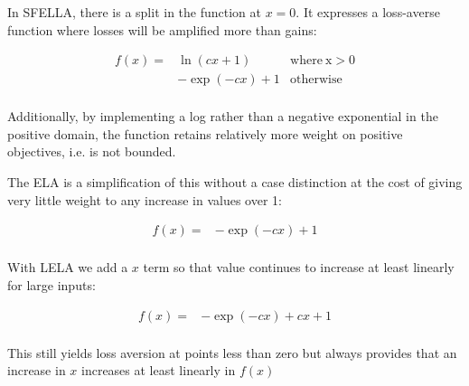 



In SFELLA, there is a split in the function at $x=0$. It expresses a loss-averse function where losses will be amplified more than gains:

\begin{align}
f(x)= & \ln(cx+1) & \mathrm{ where \: x>0} \\ \nonumber
  &  -\exp(-cx)+1 &  \mathrm{otherwise} \\ \nonumber
\end{align}

Additionally, by implementing a log rather than a negative exponential in the positive domain, the function retains relatively more weight on positive objectives, i.e. is not bounded.

The ELA is a simplification of this without a case distinction at the cost of giving very little weight to any increase in values over 1:

\begin{align}
f(x)= &  -\exp(-cx)+1 \\ \nonumber
\end{align}

With LELA we add a $x$ term so that value continues to increase at least linearly for large inputs:

\begin{align}
f(x)= &  -\exp(-cx)+cx+1 \\ \nonumber
\end{align}

This still yields loss aversion at points less than zero but always provides that an increase in $x$ increases at least linearly in $f(x)$%


